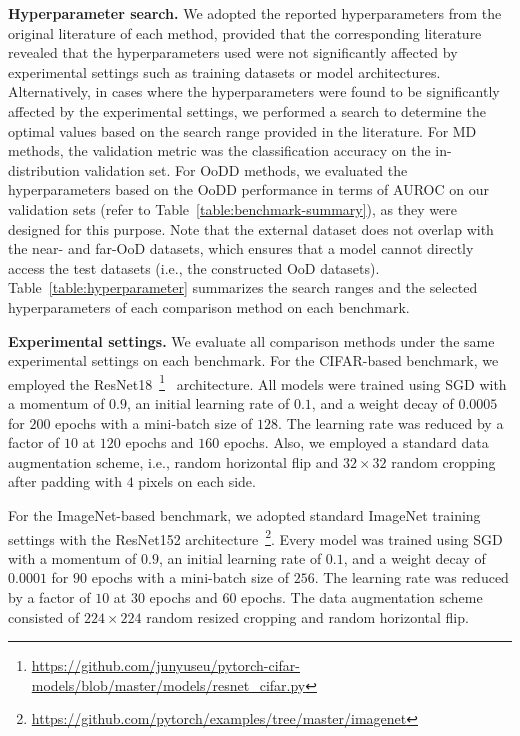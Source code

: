 \documentclass[preprint,12pt]{elsarticle}
\begin{document}
\textbf{Hyperparameter search.}
We adopted the reported hyperparameters from the original literature of each method, provided that the corresponding literature revealed that the hyperparameters used were not significantly affected by experimental settings such as training datasets or model architectures. Alternatively, in cases where the hyperparameters were found to be significantly affected by the experimental settings, we performed a search to determine the optimal values based on the search range provided in the literature. For MD methods, the validation metric was the classification accuracy on the in-distribution validation set. For OoDD methods, we evaluated the hyperparameters based on the OoDD performance in terms of AUROC on our validation sets (refer to Table~\ref{table:benchmark-summary}), as they were designed for this purpose. Note that the external dataset does not overlap with the near- and far-OoD datasets, which ensures that a model cannot directly access the test datasets (i.e., the constructed OoD datasets). Table~\ref{table:hyperparameter} summarizes the search ranges and the selected hyperparameters of each comparison method on each benchmark.

\textbf{Experimental settings.} We evaluate all comparison methods under the same experimental settings on each benchmark. For the CIFAR-based benchmark, we employed the ResNet18~\footnote{\href{https://github.com/junyuseu/pytorch-cifar-models/blob/master/models/resnet\_cifar.py}{https://github.com/junyuseu/pytorch-cifar-models/blob/master/models/resnet\_cifar.py}}~\citep{he2016identity} architecture. All models were trained using SGD with a momentum of $0.9$, an initial learning rate of $0.1$, and a weight decay of $0.0005$ for $200$ epochs with a mini-batch size of $128$. The learning rate was reduced by a factor of $10$ at $120$ epochs and $160$ epochs. Also, we employed a standard data augmentation scheme, i.e., random horizontal flip and $32\times32$ random cropping after padding with $4$ pixels on each side.

For the ImageNet-based benchmark, we adopted standard ImageNet training settings with the ResNet152 architecture~\footnote{\href{https://github.com/pytorch/examples/tree/master/imagenet}{https://github.com/pytorch/examples/tree/master/imagenet}}. Every model was trained using SGD with a momentum of $0.9$, an initial learning rate of $0.1$, and a weight decay of $0.0001$ for $90$ epochs with a mini-batch size of $256$. The learning rate was reduced by a factor of $10$ at $30$ epochs and $60$ epochs. The data augmentation scheme consisted of $224\times224$ random resized cropping and random horizontal flip.
\end{document}
